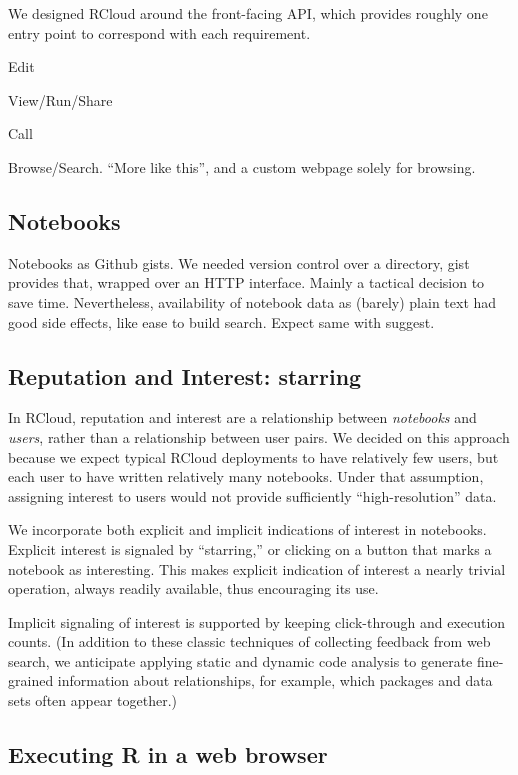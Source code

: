 We designed RCloud around the front-facing API, which provides roughly
one entry point to correspond with each requirement.

Edit

View/Run/Share

Call

Browse/Search. ``More like this'', and a custom webpage solely for browsing.

\subsection{Notebooks\label{sec:notebooks}}

Notebooks as Github gists. 
%
We needed version control over a directory, gist provides that,
wrapped over an HTTP interface.
%
Mainly a tactical decision to save time.
%
Nevertheless, availability of notebook data as (barely) plain text had good side
effects, like ease to build search. 
%
Expect same with suggest.

\subsection{Reputation and Interest: starring\label{sec:starring}}

In RCloud, reputation and interest are a relationship between
\emph{notebooks} and \emph{users}, rather than a relationship between
user pairs. We decided on this approach because we expect typical
RCloud deployments to have relatively few users, but each user to have
written relatively many notebooks. Under that assumption, assigning
interest to users would not provide sufficiently ``high-resolution'' data.

We incorporate both explicit and implicit indications of interest
in notebooks. Explicit interest is signaled by ``starring,'' or
clicking on a button that marks a notebook as interesting. 
This makes explicit indication of interest a nearly trivial operation,
always readily available, thus encouraging its use.

Implicit signaling of interest is supported by keeping click-through
\cite{Joachims:2005:AIC} and execution counts. (In addition to these
classic techniques of collecting feedback from web search, we anticipate
applying static and dynamic code analysis to generate fine-grained
information about relationships, for example, which packages and data
sets often appear together.)

\subsection{Executing R in a web browser}

